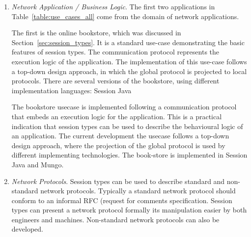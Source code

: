 \begin{enumerate}
	\item	\emph{Network Application / Business Logic}.
			The first two applications in Table~\ref{table:use_cases_all}
			come from the domain of network applications.

			The first is the online bookstore,
			which was discussed
			in Section~\ref{sec:session_types}. It is a standard use-case demonstrating
			the basic features of session types. The communication protocol represents the execution logic of the application. The implementation of this use-case follows a top-down design approach, in which the global protocol is projected to local protocols. There are several versions of the bookstore, using different implementation languages: Session Java

			The bookstore usecase is implemented following a
			communication protocol that embeds an execution logic
			for the application. This is a practical indication
			that session types can be used to describe the
			behavioural logic of an application.
			The current development the usecase follows a
			top-down design approach, where the projection
			of the global protocol is used by different
			implementing technologies.
			The book-store is implemented in Session Java and Mungo.






	\item	{\em Network Protocols}.
	Session types can be used to describe standard and non-standard network protocols.
	Typically a standard network protocol should conform to
	an informal RFC (request for comments specification. Session types
	can present a network protocol formally its manipulation easier
	by both engineers and machines.
	Non-standard network protocols can also be developed.


\end{enumerate}
